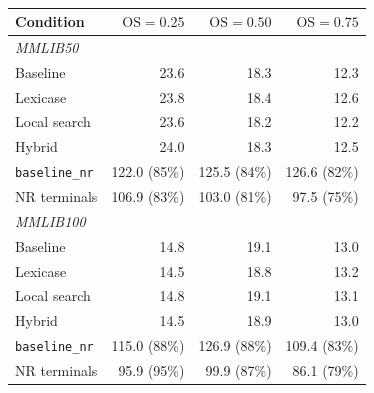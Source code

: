 \begin{table}[htbp]
  \centering
  \small
  \caption[108-class breakdown by order strength]{}
  \label{tab:full108-os}
  \begin{tabular}{lrrr}
    \toprule
    \textbf{Condition} & $\mathrm{OS} = 0.25$ & $\mathrm{OS} = 0.50$ & $\mathrm{OS} = 0.75$ \\
    \midrule
    \multicolumn{4}{l}{\textit{MMLIB50}} \\
    Baseline & 23.6 & 18.3 & 12.3 \\
    Lexicase & 23.8 & 18.4 & 12.6 \\
    Local search & 23.6 & 18.2 & 12.2 \\
    Hybrid & 24.0 & 18.3 & 12.5 \\
    \texttt{baseline\_nr} & 122.0 (85\%) & 125.5 (84\%) & 126.6 (82\%) \\
    NR terminals & 106.9 (83\%) & 103.0 (81\%) & 97.5 (75\%) \\
    \midrule
    \multicolumn{4}{l}{\textit{MMLIB100}} \\
    Baseline & 14.8 & 19.1 & 13.0 \\
    Lexicase & 14.5 & 18.8 & 13.2 \\
    Local search & 14.8 & 19.1 & 13.1 \\
    Hybrid & 14.5 & 18.9 & 13.0 \\
    \texttt{baseline\_nr} & 115.0 (88\%) & 126.9 (88\%) & 109.4 (83\%) \\
    NR terminals & 95.9 (95\%) & 99.9 (87\%) & 86.1 (79\%) \\
    \bottomrule
  \end{tabular}
\end{table}

